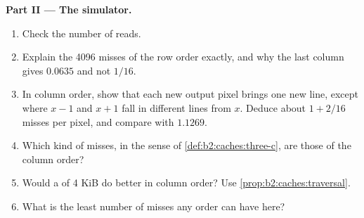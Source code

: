 \begin{problem}
\medskip\noindent\textbf{Part II --- The simulator.}\par\nopagebreak
{}
\label{out:b2:caches:blur-sim}
\begin{enumerate}[resume, beginpenalty=10000]
\item Check the number of reads.
\item Explain the 4096 misses of the row order exactly, and why the last column gives $0.0635$ and not $1/16$.
\item In column order, show that each new output pixel brings one new line, except where $x - 1$ and $x + 1$ fall in
different lines from $x$. Deduce about $1 + 2/16$ misses per pixel, and compare with $1.1269$.
\item Which kind of misses, in the sense of \cref{def:b2:caches:three-c}, are those of the column order?
\item Would a  of 4 KiB do better in column order? Use \cref{prop:b2:caches:traversal}.
\item What is the least number of misses any order can have here?
\end{enumerate}


\end{problem}
